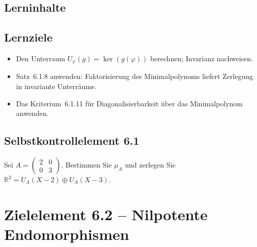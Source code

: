 \documentclass[a4paper,12pt]{article}
\begin{document}
\subsection*{Lerninhalte}
\begin{center}
\end{center}

\subsection*{Lernziele}
\begin{itemize}
  \item Den Unterraum $U_\varphi(g) = \ker(g(\varphi))$ berechnen; Invarianz nachweisen.
  \item Satz~6.1.8 anwenden: Faktorisierung des Minimalpolynoms liefert Zerlegung in invariante Unterräume.
  \item Das Kriterium~6.1.11 für Diagonalisierbarkeit über das Minimalpolynom anwenden.
\end{itemize}

\subsection*{Selbstkontrollelement 6.1}
Sei $A = \begin{pmatrix}2&0\\0&3\end{pmatrix}$. Bestimmen Sie $\mu_A$ und zerlegen Sie $\mathbb{R}^2 = U_A(X-2) \oplus U_A(X-3)$.

\newpage

\section*{Zielelement 6.2 -- Nilpotente Endomorphismen}
\end{document}
